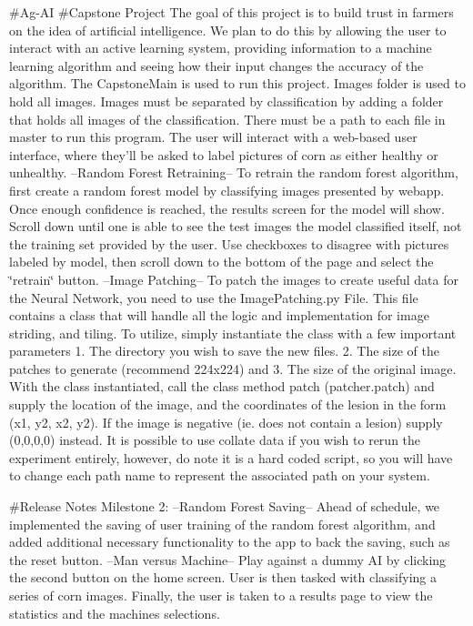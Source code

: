 \#\+Ag-\/AI \#\+Capstone Project The goal of this project is to build trust in farmers on the idea of artificial intelligence. We plan to do this by allowing the user to interact with an active learning system, providing information to a machine learning algorithm and seeing how their input changes the accuracy of the algorithm. The Capstone\+Main is used to run this project. Images folder is used to hold all images. Images must be separated by classification by adding a folder that holds all images of the classification. There must be a path to each file in master to run this program. The user will interact with a web-\/based user interface, where they’ll be asked to label pictures of corn as either healthy or unhealthy. --Random Forest Retraining-- To retrain the random forest algorithm, first create a random forest model by classifying images presented by webapp. Once enough confidence is reached, the results screen for the model will show. Scroll down until one is able to see the test images the model classified itself, not the training set provided by the user. Use checkboxes to disagree with pictures labeled by model, then scroll down to the bottom of the page and select the \char`\"{}retrain\char`\"{} button. --Image Patching-- To patch the images to create useful data for the Neural Network, you need to use the Image\+Patching.\+py File. This file contains a class that will handle all the logic and implementation for image striding, and tiling. To utilize, simply instantiate the class with a few important parameters 1. The directory you wish to save the new files. 2. The size of the patches to generate (recommend 224x224) and 3. The size of the original image. With the class instantiated, call the class method patch (patcher.\+patch) and supply the location of the image, and the coordinates of the lesion in the form (x1, y2, x2, y2). If the image is negative (ie. does not contain a lesion) supply (0,0,0,0) instead. It is possible to use collate data if you wish to rerun the experiment entirely, however, do note it is a hard coded script, so you will have to change each path name to represent the associated path on your system.

\#\+Release Notes Milestone 2\+: –\+Random Forest Saving– Ahead of schedule, we implemented the saving of user training of the random forest algorithm, and added additional necessary functionality to the app to back the saving, such as the reset button. --Man versus Machine-- Play against a dummy AI by clicking the second button on the home screen. User is then tasked with classifying a series of corn images. Finally, the user is taken to a results page to view the statistics and the machine\textquotesingle{}s selections.


